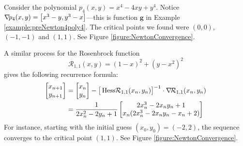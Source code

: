\begin{example}\label{example:NewtonPoly4}
Consider the polynomial $p_4(x,y) = x^4-4xy+y^4$. Notice $\mathop{\nabla\! {p_4}}(x,y) = \big[ x^3-y, y^3-x \big]$---this is function $\boldsymbol{g}$ in Example \ref{example:preNewton4poly4}.  The critical points we found were $(0,0)$, $(-1,-1)$ and $(1,1)$.  See Figure \ref{figure:NewtonConvergence}.
\end{example}
\begin{example}
A similar process for the Rosenbrock function 
\begin{equation*}
\mathcal{R}_{1,1}(x,y) = (1-x)^2 + (y-x^2)^2
\end{equation*}
gives the following recurrence formula:
\begin{align*}
\begin{bmatrix} x_{n+1} \\ y_{n+1} \end{bmatrix} &=
\begin{bmatrix} x_{n} \\ y_{n} \end{bmatrix} - \big[ \mathop{\mathrm{Hess}{\mathcal{R}_{1,1}}}(x_n,y_n) \big]^{-1} \cdot \mathop{\nabla\! {\mathcal{R}_{1,1}}}(x_n, y_n) \\
&= \frac{1}{2x_n^2-2y_n+1} \begin{bmatrix}
2x_n^3-2x_n y_n+1 \\ x_n(2x_n^3-2x_n y_n-x_n+2)
\end{bmatrix}
\end{align*}
For instance, starting with the initial guess $(x_0, y_0) = (-2,2)$, the sequence converges to the critical point $(1,1)$.  See Figure \ref{figure:NewtonConvergence}.
\end{example}
